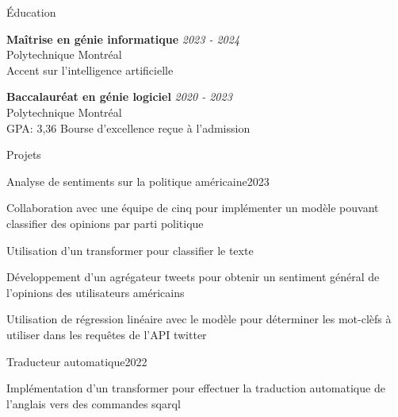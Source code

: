 \documentclass{resume} %
\begin{document}

\begin{rSection}{Éducation}

	{\bf Maîtrise en génie informatique} \hfill {\em 2023 - 2024}
	\\ Polytechnique Montréal
	\\ Accent sur l'intelligence artificielle

		{\bf Baccalauréat en génie logiciel} \hfill {\em 2020 - 2023}
	\\ Polytechnique Montréal
	\\GPA: 3,36 \hspace{0.5cm}  Bourse d'excellence reçue à l'admission


\end{rSection}

\begin{rSection}{Projets}
	\begin{rSubsection}{Analyse de sentiments sur la politique américaine}{2023}{}{}

		\item Collaboration avec une équipe de cinq pour implémenter un modèle pouvant classifier des opinions par parti politique
		\item Utilisation d'un transformer pour classifier le texte
		\item Développement d'un agrégateur tweets pour obtenir un sentiment général de l'opinions des utilisateurs américains
		\item Utilisation de régression linéaire avec le modèle pour déterminer les mot-clèfs à utiliser dans les requêtes de l'API twitter
	\end{rSubsection}
	\begin{rSubsection}{Traducteur automatique}{2022}{}{}
		\item Implémentation d'un transformer pour effectuer la traduction automatique de l'anglais vers des commandes sqarql
	\end{rSubsection}

\end{rSection}
\end{document}
